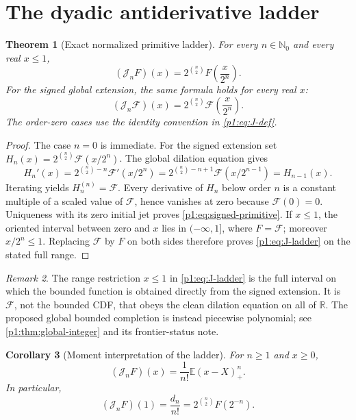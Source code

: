 \documentclass[11pt,oneside]{article}
\newtheorem{theorem}{Theorem}[section]
\newtheorem{corollary}[theorem]{Corollary}
\theoremstyle{definition}
\theoremstyle{remark}
\newtheorem{remark}[theorem]{Remark}
\newcommand{\Fs}{\mathcal F}
\newcommand{\E}{\mathbb E}
\newcommand{\R}{\mathbb R}
\newcommand{\N}{\mathbb N}
\newcommand{\Jn}{\mathcal J}
\newcommand{\1}{\mathbf 1}
\begin{document}
\section{The dyadic antiderivative ladder}

\begin{theorem}[Exact normalized primitive ladder]\label{p1:thm:ladder}
For every \(n\in\N_0\) and every real \(x\leq1\),
\begin{equation}
 \boxed{\quad
 (\Jn_nF)(x)=2^{\binom n2}F\!\left(\frac{x}{2^n}\right).
 \quad}                                                        \label{p1:eq:J-ladder}
\end{equation}
For the signed global extension, the same formula holds for every real \(x\):
\begin{equation}
 (\Jn_n\Fs)(x)=2^{\binom n2}\Fs\!\left(\frac{x}{2^n}\right).              \label{p1:eq:signed-primitive}
\end{equation}
The order-zero cases use the identity convention in \eqref{p1:eq:J-def}.
\end{theorem}

\begin{proof}
The case \(n=0\) is immediate.  For the signed extension set
\(H_n(x)=2^{\binom n2}\Fs(x/2^n)\).  The global dilation equation gives
\[
 H_n'(x)
 =2^{\binom n2-n}\Fs'(x/2^n)
 =2^{\binom n2-n+1}\Fs(x/2^{n-1})
 =H_{n-1}(x).
\]
Iterating yields \(H_n^{(n)}=\Fs\).  Every derivative of \(H_n\) below order
\(n\) is a constant multiple of a scaled value of \(\Fs\), hence vanishes at
zero because \(\Fs(0)=0\).  Uniqueness with its zero initial jet proves
\eqref{p1:eq:signed-primitive}.  If \(x\leq1\), the oriented interval between
zero and \(x\) lies in \(( -\infty,1]\), where \(F=\Fs\); moreover
\(x/2^n\leq1\).  Replacing \(\Fs\) by \(F\) on both sides therefore proves
\eqref{p1:eq:J-ladder} on the stated full range.
\end{proof}

\begin{remark}
The range restriction \(x\leq1\) in \eqref{p1:eq:J-ladder} is the full interval
on which the bounded function is obtained directly from the signed extension.
It is \(\Fs\), not the bounded CDF, that obeys the clean dilation equation on
all of \(\R\).  The proposed global bounded completion is instead piecewise
polynomial; see \cref{p1:thm:global-integer} and its frontier-status note.
\end{remark}

\begin{corollary}[Moment interpretation of the ladder]\label{p1:cor:J-moment}
For \(n\geq1\) and \(x\geq0\),
\begin{equation}
 (\Jn_nF)(x)=\frac1{n!}\E (x-X)_+^n.                            \label{p1:eq:J-stoploss}
\end{equation}
In particular,
\begin{equation}
 (\Jn_nF)(1)=\frac{d_n}{n!}
 =2^{\binom n2}F(2^{-n}).                                      \label{p1:eq:J-one}
\end{equation}
\end{corollary}
\end{document}
